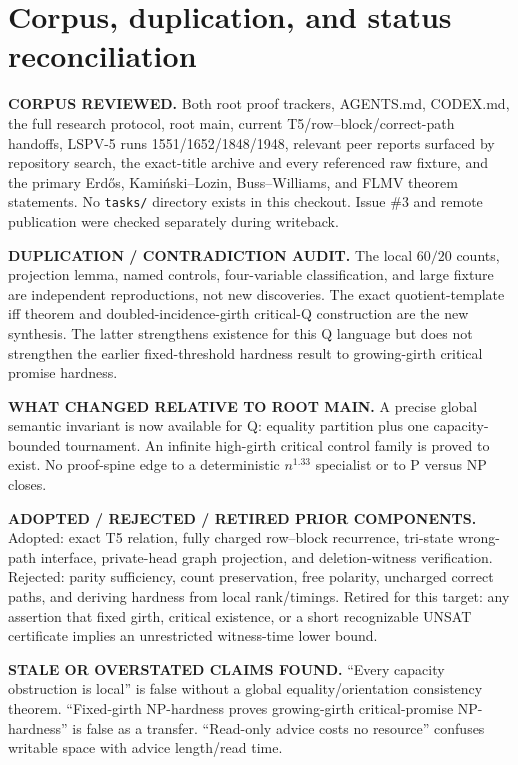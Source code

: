 \documentclass[11pt]{article}
\begin{document}
\section{Corpus, duplication, and status reconciliation}
\textbf{CORPUS REVIEWED.}  Both root proof trackers, AGENTS.md, CODEX.md, the full research protocol, root main, current T5/row--block/correct-path handoffs, LSPV-5 runs 1551/1652/1848/1948, relevant peer reports surfaced by repository search, the exact-title archive and every referenced raw fixture, and the primary Erd\H{o}s, Kami\'nski--Lozin, Buss--Williams, and FLMV theorem statements.  No \texttt{tasks/} directory exists in this checkout.  Issue \#3 and remote publication were checked separately during writeback.

\textbf{DUPLICATION / CONTRADICTION AUDIT.}  The local $60/20$ counts, projection lemma, named controls, four-variable classification, and large fixture are independent reproductions, not new discoveries.  The exact quotient-template iff theorem and doubled-incidence-girth critical-Q construction are the new synthesis.  The latter strengthens existence for this Q language but does not strengthen the earlier fixed-threshold hardness result to growing-girth critical promise hardness.

\textbf{WHAT CHANGED RELATIVE TO ROOT MAIN.}  A precise global semantic invariant is now available for Q: equality partition plus one capacity-bounded tournament.  An infinite high-girth critical control family is proved to exist.  No proof-spine edge to a deterministic $n^{1.33}$ specialist or to P versus NP closes.

\textbf{ADOPTED / REJECTED / RETIRED PRIOR COMPONENTS.}  Adopted: exact T5 relation, fully charged row--block recurrence, tri-state wrong-path interface, private-head graph projection, and deletion-witness verification.  Rejected: parity sufficiency, count preservation, free polarity, uncharged correct paths, and deriving hardness from local rank/timings.  Retired for this target: any assertion that fixed girth, critical existence, or a short recognizable UNSAT certificate implies an unrestricted witness-time lower bound.

\textbf{STALE OR OVERSTATED CLAIMS FOUND.}  ``Every capacity obstruction is local'' is false without a global equality/orientation consistency theorem.  ``Fixed-girth NP-hardness proves growing-girth critical-promise NP-hardness'' is false as a transfer.  ``Read-only advice costs no resource'' confuses writable space with advice length/read time.
\end{document}
